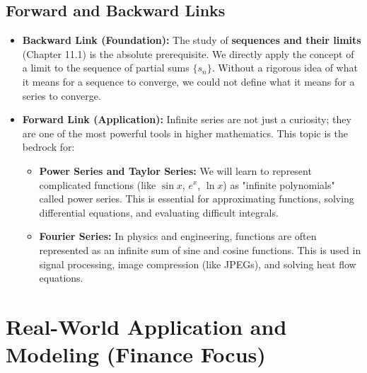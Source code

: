 \documentclass{article}
\begin{document}
\subsection{Forward and Backward Links}
\begin{itemize}
    \item \textbf{Backward Link (Foundation):} The study of \textbf{sequences and their limits} (Chapter 11.1) is the absolute prerequisite. We directly apply the concept of a limit to the sequence of partial sums $\{s_n\}$. Without a rigorous idea of what it means for a sequence to converge, we could not define what it means for a series to converge.
    \item \textbf{Forward Link (Application):} Infinite series are not just a curiosity; they are one of the most powerful tools in higher mathematics. This topic is the bedrock for:
        \begin{itemize}
            \item \textbf{Power Series and Taylor Series:} We will learn to represent complicated functions (like $\sin x$, $e^x$, $\ln x$) as "infinite polynomials" called power series. This is essential for approximating functions, solving differential equations, and evaluating difficult integrals.
            \item \textbf{Fourier Series:} In physics and engineering, functions are often represented as an infinite sum of sine and cosine functions. This is used in signal processing, image compression (like JPEGs), and solving heat flow equations.
        \end{itemize}
\end{itemize}

\section{Real-World Application and Modeling (Finance Focus)}
\end{document}
